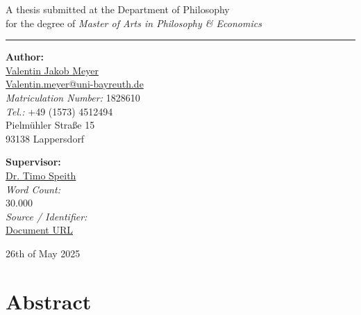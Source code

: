 \documentclass[
  11pt,
  letterpaper,
]{book}
\renewcommand*\contentsname{Table of contents}
\newcommand\contentsname{Table of contents}
\begin{document}
\begin{titlepage}
\begin{center}
  A thesis submitted at the Department of Philosophy\\[0.4cm]
  for the degree of \textit{Master of Arts in Philosophy \& Economics}
\end{center}

\vspace{1.5cm}
\hrule
\vspace{1.5cm}

\begin{minipage}[t]{0.48\textwidth}
  \textbf{Author:}\\[0.3cm]
  \href{https://www.vjmeyer.org}{Valentin Jakob Meyer}\\
  \href{mailto:Valentin.meyer@uni-bayreuth.de}{Valentin.meyer@uni-bayreuth.de}\\
  \textit{Matriculation Number:} 1828610\\
  \textit{Tel.:} +49 (1573) 4512494\\
  Pielmühler Straße 15\\
  93138 Lappersdorf
\end{minipage}
\hfill
\begin{minipage}[t]{0.48\textwidth}
  \begin{flushright}
    \textbf{Supervisor:}\\[0.3cm]
    \href{mailto:timo.speith@uni-bayreuth.de}{Dr. Timo Speith}\\[0.35cm]
    \textit{Word Count:}\\
    30.000\\[0.1cm]
    \textit{Source / Identifier:}\\
    \href{https://github.com/VJMeyer/submission}{Document URL}
  \end{flushright}
\end{minipage}

\vfill
\begin{center}
  26th of May 2025
\end{center}
\end{titlepage}

\cleardoublepage

\renewcommand*\contentsname{Table of Contents}
{
\setcounter{tocdepth}{9}
\tableofcontents
}
\listoffigures
\listoftables

\mainmatter
{}

\chapter{Abstract}\label{sec-abstract}
\end{document}
